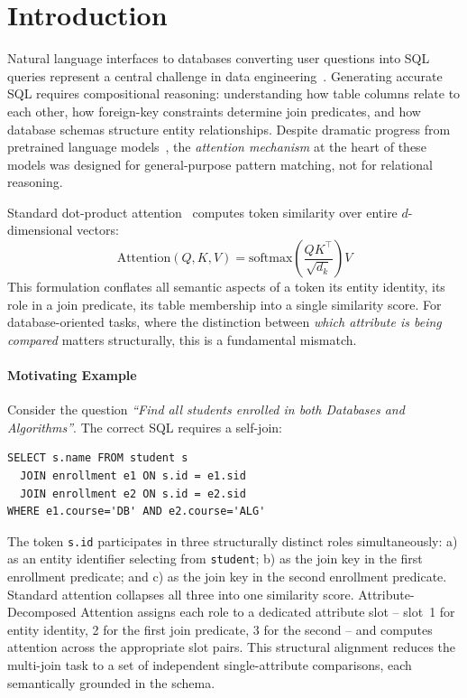 \documentclass[review]{elsarticle}
\newcommand{\softmax}{\mathrm{softmax}}
\begin{document}
\linenumbers

\section{Introduction}

Natural language interfaces to databases converting user questions into SQL queries represent a central challenge in data engineering~\cite{fu2023catsql,li2024nl2sql360,fan2023gar}. Generating accurate SQL requires compositional reasoning: understanding how table columns relate to each other, how foreign-key constraints determine join predicates, and how database schemas structure entity relationships. Despite dramatic progress from pretrained language models~\cite{qi2022rasat,bazaga2023sqlformer}, the \emph{attention mechanism} at the heart of these models was designed for general-purpose pattern matching, not for relational reasoning.

Standard dot-product attention~\cite{vaswani2017attention} computes token similarity over entire $d$-dimensional vectors:
\begin{equation}
\mathrm{Attention}(Q,K,V) = \softmax\!\left(\frac{QK^\top}{\sqrt{d_k}}\right)V
\label{eq:std}
\end{equation}
This formulation conflates all semantic aspects of a token its entity identity, its role in a join predicate, its table membership into a single similarity score. For database-oriented tasks, where the distinction between \emph{which attribute is being compared} matters structurally, this is a fundamental mismatch.

\paragraph{Motivating Example}
Consider the question \textit{``Find all students enrolled in both Databases and Algorithms''}. The correct SQL requires a self-join:
\begin{verbatim}
SELECT s.name FROM student s
  JOIN enrollment e1 ON s.id = e1.sid
  JOIN enrollment e2 ON s.id = e2.sid
WHERE e1.course='DB' AND e2.course='ALG'
\end{verbatim}
The token \texttt{s.id} participates in three structurally distinct roles simultaneously: a) as an entity identifier selecting from \texttt{student}; b) as the join key in the first enrollment predicate; and c) as the join key in the second enrollment predicate. Standard attention collapses all three into one similarity score. Attribute-Decomposed Attention assigns each role to a dedicated attribute slot -- slot~1 for entity identity, 2 for the first join predicate, 3 for the second -- and computes attention across the appropriate slot pairs. This structural alignment reduces the multi-join task to a set of independent single-attribute comparisons, each semantically grounded in the schema.
\end{document}
